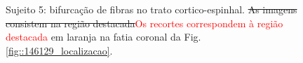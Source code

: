 \begin{figure}[H]
\centering
    \hfill
    \caption{Sujeito 5: bifurcação de fibras no trato cortico-espinhal. \sout{As imagens consistem na região destacada}\textcolor{red}{Os recortes correspondem à região destacada} em laranja na fatia coronal da Fig. \ref{fig::146129_localizacao}.
    }
    \label{fig::146129_fanning}
\end{figure}

